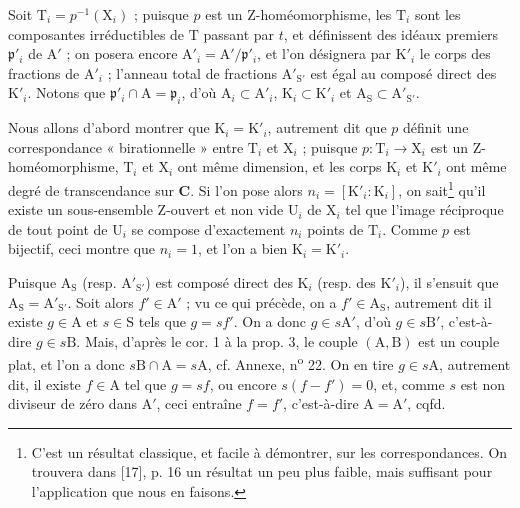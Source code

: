 Soit $\mathrm{T}_i = p^{-1}(\mathrm{X}_i)$ ; puisque $p$ est un Z-homéomorphisme, les $\mathrm{T}_i$ sont les composantes irréductibles de $\mathrm{T}$ passant par $t$, et définissent des idéaux premiers $\mathfrak{p}'_i$ de $\mathrm{A}'$ ; on posera encore $\mathrm{A}'_i = \mathrm{A}'/\mathfrak{p}'_i$, et l'on désignera par $\mathrm{K}'_i$ le corps des fractions de $\mathrm{A}'_i$ ; l'anneau total de fractions $\mathrm{A}'_{\mathrm{S}'}$ est égal au composé direct des $\mathrm{K}'_i$. Notons que $\mathfrak{p}'_i \cap \mathrm{A} = \mathfrak{p}_i$, d'où $\mathrm{A}_i \subset \mathrm{A}'_i$, $\mathrm{K}_i \subset \mathrm{K}'_i$ et $\mathrm{A}_\mathrm{S} \subset \mathrm{A}'_{\mathrm{S}'}$.

Nous allons d'abord montrer que $\mathrm{K}_i = \mathrm{K}'_i$, autrement dit que $p$ définit une correspondance « birationnelle » entre $\mathrm{T}_i$ et $\mathrm{X}_i$ ; puisque $p : \mathrm{T}_i \to \mathrm{X}_i$ est un Z-homéomorphisme, $\mathrm{T}_i$ et $\mathrm{X}_i$ ont même dimension, et les corps $\mathrm{K}_i$ et $\mathrm{K}'_i$ ont même degré de transcendance sur $\mathbf{C}$. Si l'on pose alors $n_i = [\mathrm{K}'_i : \mathrm{K}_i]$, on sait\footnote{C'est un résultat classique, et facile à démontrer, sur les correspondances. On trouvera dans [17], p. 16 un résultat un peu plus faible, mais suffisant pour l'application que nous en faisons.} qu'il existe un sous-ensemble Z-ouvert et non vide $\mathrm{U}_i$ de $\mathrm{X}_i$ tel que l'image réciproque de tout point de $\mathrm{U}_i$ se compose d'exactement $n_i$ points de $\mathrm{T}_i$. Comme $p$ est bijectif, ceci montre que $n_i = 1$, et l'on a bien $\mathrm{K}_i = \mathrm{K}'_i$.

Puisque $\mathrm{A}_\mathrm{S}$ (resp. $\mathrm{A}'_{\mathrm{S}'}$) est composé direct des $\mathrm{K}_i$ (resp. %
des $\mathrm{K}'_i$), il s'ensuit que $\mathrm{A}_\mathrm{S} = \mathrm{A}'_{\mathrm{S}'}$. Soit alors $f' \in \mathrm{A}'$ ; vu ce qui précède, on a $f' \in \mathrm{A}_\mathrm{S}$, autrement dit il existe $g \in \mathrm{A}$ et $s \in \mathrm{S}$ tels que $g = sf'$. On a donc $g \in s\mathrm{A}'$, d'où $g \in s\mathrm{B}'$, c'est-à-dire $g \in s\mathrm{B}$. Mais, d'après le cor. 1 à la prop. 3, le couple $(\mathrm{A}, \mathrm{B})$ est un couple plat, et l'on a donc $s\mathrm{B} \cap \mathrm{A} = s\mathrm{A}$, cf. Annexe, n\textsuperscript{o} 22. On en tire $g \in s\mathrm{A}$, autrement dit, il existe $f \in \mathrm{A}$ tel que $g = sf$, ou encore $s(f - f') = 0$, et, comme $s$ est non diviseur de zéro dans $\mathrm{A}'$, ceci entraîne $f = f'$, c'est-à-dire $\mathrm{A} = \mathrm{A}'$, cqfd.


